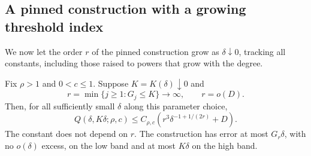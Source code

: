 \subsection{A pinned construction with a growing threshold index}
We now let the order $r$ of the pinned construction grow as $\delta\downarrow0$, tracking all constants, including those raised to powers that grow with the degree.
\begin{theorem}\label{thm:joint-pinned}
Fix $\rho>1$ and $0<c\leq1$. Suppose $K=K(\delta)\downarrow0$ and
\[
 r=\min\{j\geq1:G_j\leq K\}\longrightarrow\infty,
 \qquad r=o(D).
\]
Then, for all sufficiently small $\delta$ along this parameter choice,
\begin{equation}\label{eq:joint-pinned-query}
 Q(\delta,K\delta;\rho,c)
 \leq C_{\rho,c}\left(r^3\delta^{-1+1/(2r)}+D\right).
\end{equation}
The constant does not depend on $r$. The construction has error at most $G_r\delta$, with no $o(\delta)$ excess, on the low band and at most $K\delta$ on the high band.
\end{theorem}
